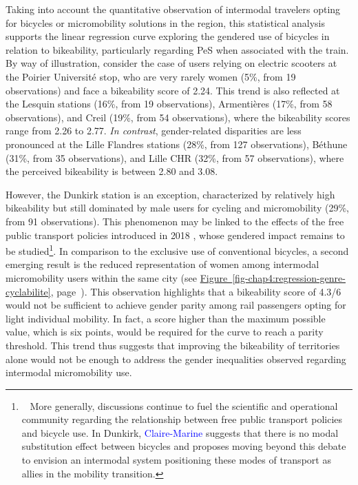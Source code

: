 \begin{refsegment}
Taking into account the quantitative observation of intermodal travelers opting for bicycles or micromobility solutions in the region, this statistical analysis supports the linear regression curve exploring the gendered use of bicycles in relation to bikeability, particularly regarding \acrshort{PeS} when associated with the train. By way of illustration, consider the case of users relying on electric scooters at the Poirier Université stop, who are very rarely women (5\%, from 19 observations) and face a bikeability score of 2.24. This trend is also reflected at the Lesquin stations (16\%, from 19 observations), Armentières (17\%, from 58 observations), and Creil (19\%, from 54 observations), where the bikeability scores range from 2.26 to 2.77. \textsl{In contrast}, gender-related disparities are less pronounced at the Lille Flandres stations (28\%, from 127 observations), Béthune (31\%, from 35 observations), and Lille CHR (32\%, from 57 observations), where the perceived bikeability is between 2.80 and 3.08.%

However, the Dunkirk station is an exception, characterized by relatively high bikeability but still dominated by male users for cycling and micromobility (29\%, from 91 observations). This phenomenon may be linked to the effects of the free public transport policies introduced in 2018 \textcolor{blue}{\autocite{heran_transports_2020}}, whose gendered impact remains to be studied\footnote{~
    More generally, discussions continue to fuel the scientific and operational community regarding the relationship between free public transport policies and bicycle use. In Dunkirk, \textcolor{blue}{Claire-Marine} \textcolor{blue}{\textcite[89]{javary_gratuite_2020}} suggests that there is no modal substitution effect between bicycles and proposes moving beyond this debate to envision an intermodal system positioning these modes of transport as allies in the mobility transition.
}. In comparison to the exclusive use of conventional bicycles, a second emerging result is the reduced representation of women among intermodal micromobility users within the same city (see \hyperref[fig-chap4:regression-genre-cyclabilite]{Figure~\ref{fig-chap4:regression-genre-cyclabilite}}, page~\pageref{fig-chap4:regression-genre-cyclabilite}). This observation highlights that a bikeability score of 4.3/6 would not be sufficient to achieve gender parity among rail passengers opting for light individual mobility. In fact, a score higher than the maximum possible value, which is six points, would be required for the curve to reach a parity threshold. This trend thus suggests that improving the bikeability of territories alone would not be enough to address the gender inequalities observed regarding intermodal micromobility use.%


\end{refsegment}
